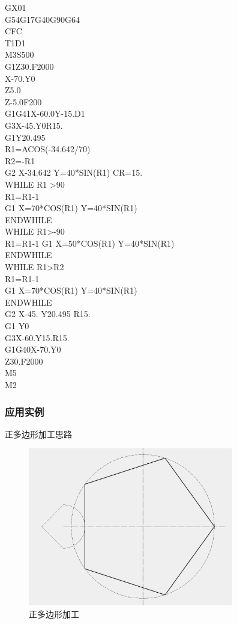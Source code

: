 GX01 \\
G54G17G40G90G64\\
CFC\\
T1D1\\
M3S500\\
G1Z30.F2000\\
X-70.Y0\\
Z5.0\\
Z-5.0F200\\
G1G41X-60.0Y-15.D1\\
G3X-45.Y0R15.\\
G1Y20.495\\
R1=ACOS(-34.642/70)\\
R2=-R1\\
G2 X-34.642  Y=40*SIN(R1)  CR=15.\\
WHILE  R1 >90\\
R1=R1-1\\
G1 X=70*COS(R1)  Y=40*SIN(R1)\\
ENDWHILE\\
WHILE  R1>-90\\
R1=R1-1
G1 X=50*COS(R1)  Y=40*SIN(R1)\\
ENDWHILE\\
WHILE  R1>R2\\
R1=R1-1\\
G1 X=70*COS(R1)  Y=40*SIN(R1)\\
ENDWHILE\\
G2 X-45. Y20.495 R15.\\
G1 Y0\\
G3X-60.Y15.R15.\\
G1G40X-70.Y0\\
Z30.F2000\\
M5\\
M2\\

\subsubsection{应用实例}
正多边形加工思路

	\begin{figure}[!hbtp]
	\centering	\includegraphics[width=0.8\textwidth]{images/5-2.jpg}
	\caption{正多边形加工} \label{正多边形加工}
\end{figure}

